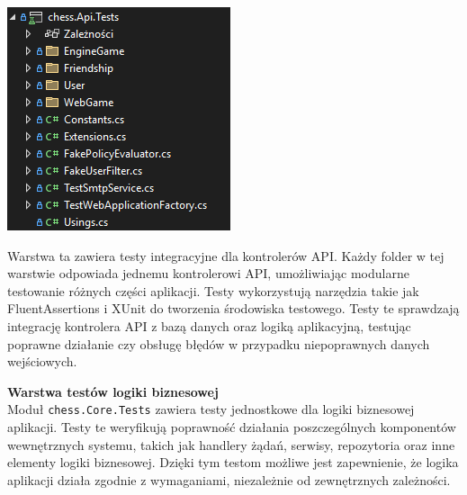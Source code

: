 \documentclass[12pt,a4paper]{article}
\begin{document}
\vspace{0.5cm}
\begin{minipage}[t]{0.45\textwidth}
    \vspace{0pt}
    \centering
    \includegraphics[width=\linewidth]{images/struktura_back_api_tests.png} 
\end{minipage}
\hfill
\begin{minipage}[t]{0.45\textwidth}
    \vspace{0pt}
    \justifying 
    \noindent
    Warstwa ta zawiera testy integracyjne dla kontrolerów API. Każdy folder w tej warstwie odpowiada jednemu kontrolerowi API, umożliwiając modularne testowanie różnych części aplikacji. Testy wykorzystują narzędzia takie jak FluentAssertions i XUnit do tworzenia środowiska testowego. Testy te sprawdzają integrację kontrolera API z bazą danych oraz logiką aplikacyjną, testując poprawne działanie czy obsługę błędów w przypadku niepoprawnych danych wejściowych.
\end{minipage}
\vspace{0.5cm}

\noindent \textbf{Warstwa testów logiki biznesowej}\\
Moduł \texttt{chess.Core.Tests} zawiera testy jednostkowe dla logiki biznesowej aplikacji. Testy te weryfikują poprawność działania poszczególnych komponentów wewnętrznych systemu, takich jak handlery żądań, serwisy, repozytoria oraz inne elementy logiki biznesowej. Dzięki tym testom możliwe jest zapewnienie, że logika aplikacji działa zgodnie z wymaganiami, niezależnie od zewnętrznych zależności.
\end{document}
